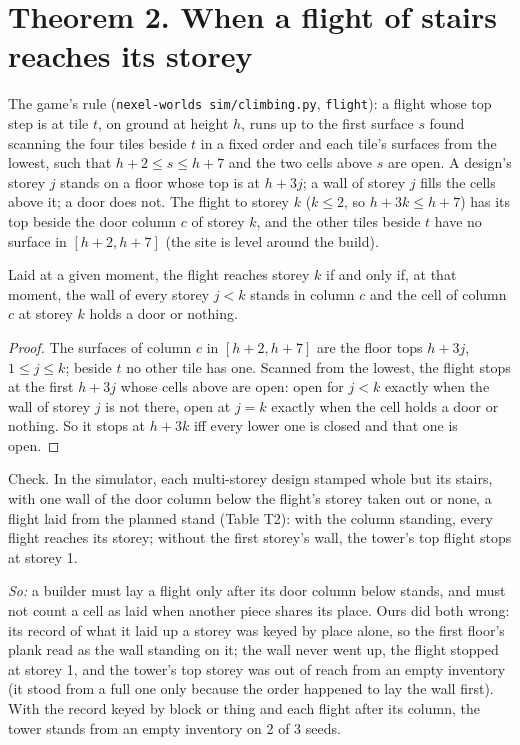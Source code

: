 \section*{Theorem 2. When a flight of stairs reaches its storey}
The game's rule (\texttt{nexel-worlds sim/climbing.py}, \texttt{flight}): a flight whose top step is at tile $t$, on
ground at height $h$, runs up to the first surface $s$ found scanning the four tiles beside $t$ in a fixed order and
each tile's surfaces from the lowest, such that $h+2\le s\le h+7$ and the two cells above $s$ are open. A design's
storey $j$ stands on a floor whose top is at $h+3j$; a wall of storey $j$ fills the cells above it; a door does not.
The flight to storey $k$ ($k\le2$, so $h+3k\le h+7$) has its top beside the door column $c$ of storey $k$, and the
other tiles beside $t$ have no surface in $[h+2,h+7]$ (the site is level around the build).
\begin{theorem} Laid at a given moment, the flight reaches storey $k$ if and only if, at that moment, the wall of every
storey $j<k$ stands in column $c$ and the cell of column $c$ at storey $k$ holds a door or nothing.\end{theorem}
\begin{proof} The surfaces of column $c$ in $[h+2,h+7]$ are the floor tops $h+3j$, $1\le j\le k$; beside $t$ no other
tile has one. Scanned from the lowest, the flight stops at the first $h+3j$ whose cells above are open: open for
$j<k$ exactly when the wall of storey $j$ is not there, open at $j=k$ exactly when the cell holds a door or nothing.
So it stops at $h+3k$ iff every lower one is closed and that one is open.\end{proof}
\noindent Check. In the simulator, each multi-storey design stamped whole but its stairs, with one wall of the door
column below the flight's storey taken out or none, a flight laid from the planned stand (Table T2): with the column
standing, every flight reaches its storey; without the first storey's wall, the tower's top flight stops at storey 1.

\emph{So:} a builder must lay a flight only after its door column below stands, and must not count a cell as laid when
another piece shares its place. Ours did both wrong: its record of what it laid up a storey was keyed by place alone,
so the first floor's plank read as the wall standing on it; the wall never went up, the flight stopped at storey 1,
and the tower's top storey was out of reach from an empty inventory (it stood from a full one only because the order
happened to lay the wall first). With the record keyed by block or thing and each flight after its column, the tower
stands from an empty inventory on 2 of 3 seeds.

